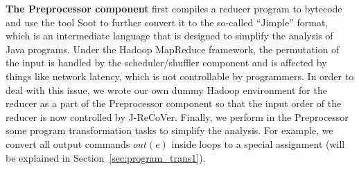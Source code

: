 \documentclass{llncs}
\begin{document}
\textbf{The Preprocessor component} first compiles a reducer program to bytecode and use the tool Soot to further convert it to the so-called ``Jimple'' format, which is an intermediate language that is designed to simplify the analysis of Java programs. Under the Hadoop MapReduce framework, the permutation of the input is handled by the scheduler/shuffler component and is affected by things like network latency, which is not controllable by programmers. In order to deal with this issue, we wrote our own dummy Hadoop environment for the reducer as a part of the Preprocessor component so that the input order of the reducer is now controlled by J-ReCoVer. Finally, we perform in the Preprocessor some program transformation tasks to simplify the analysis. For example, we convert all output commands $out(e)$ inside loops to a special assignment (will be explained in Section~\ref{sec:program_trans1}).
\end{document}
